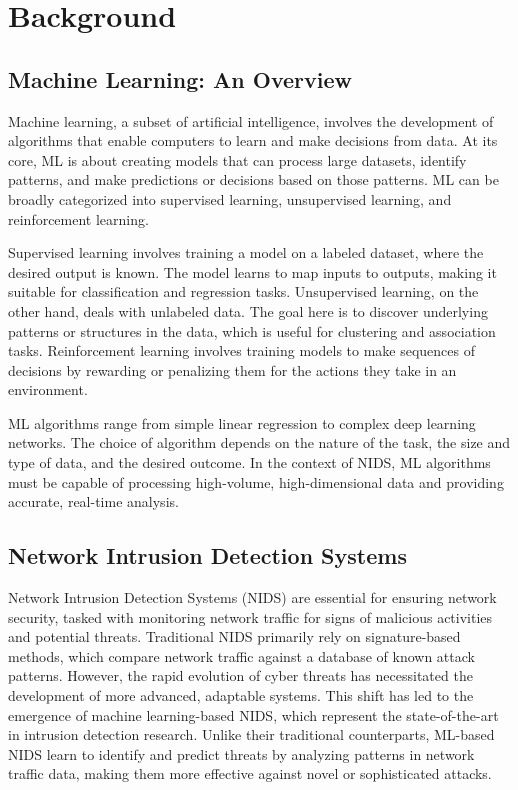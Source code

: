 \chapter{Background}

\section{Machine Learning: An Overview}
Machine learning, a subset of artificial intelligence, involves the development of algorithms that enable computers to learn and make decisions from data. At its core, ML is about creating models that can process large datasets, identify patterns, and make predictions or decisions based on those patterns. ML can be broadly categorized into supervised learning, unsupervised learning, and reinforcement learning.

Supervised learning involves training a model on a labeled dataset, where the desired output is known. The model learns to map inputs to outputs, making it suitable for classification and regression tasks. Unsupervised learning, on the other hand, deals with unlabeled data. The goal here is to discover underlying patterns or structures in the data, which is useful for clustering and association tasks. Reinforcement learning involves training models to make sequences of decisions by rewarding or penalizing them for the actions they take in an environment.

ML algorithms range from simple linear regression to complex deep learning networks. The choice of algorithm depends on the nature of the task, the size and type of data, and the desired outcome. In the context of NIDS, ML algorithms must be capable of processing high-volume, high-dimensional data and providing accurate, real-time analysis.

\section{Network Intrusion Detection Systems}
Network Intrusion Detection Systems (NIDS) are essential for ensuring network security, tasked with monitoring network 
traffic for signs of malicious activities and potential threats. Traditional NIDS primarily rely on signature-based 
methods, which compare network traffic against a database of known attack patterns. However, the rapid evolution of 
cyber threats has necessitated the development of more advanced, adaptable systems. This shift has led to the emergence 
of machine learning-based NIDS, which represent the state-of-the-art in intrusion detection research. Unlike their 
traditional counterparts, ML-based NIDS learn to identify and predict threats by analyzing patterns in network traffic 
data, making them more effective against novel or sophisticated attacks.

